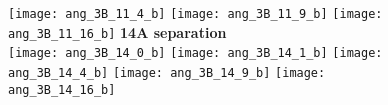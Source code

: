 \documentclass[journal=acsnano,manuscript=article]{achemso}
\begin{document}
\begin{figure}[h!]
	\texttt{[image: ang\_3B\_11\_4\_b]}
	\texttt{[image: ang\_3B\_11\_9\_b]}
	\texttt{[image: ang\_3B\_11\_16\_b]}
	\textbf{14A separation} \\
	\texttt{[image: ang\_3B\_14\_0\_b]} 
	\texttt{[image: ang\_3B\_14\_1\_b]}
	\texttt{[image: ang\_3B\_14\_4\_b]}
	\texttt{[image: ang\_3B\_14\_9\_b]}
	\texttt{[image: ang\_3B\_14\_16\_b]}
	\label{fig:ang}
\end{figure}
\end{document}
